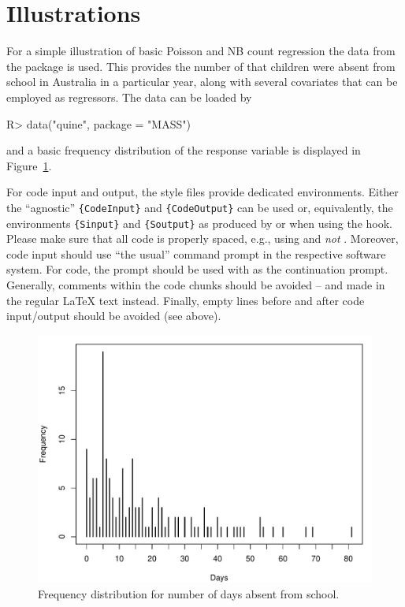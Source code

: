 \documentclass[article]{jss}
\newcommand{\fct}[1]{\code{#1()}}
\begin{document}
\section{Illustrations} \label{sec:illustrations}

For a simple illustration of basic Poisson and NB count regression the
 data from the  package is used. This provides the number
of  that children were absent from school in Australia in a
particular year, along with several covariates that can be employed as regressors.
The data can be loaded by
%
\begin{CodeChunk}
  \begin{CodeInput}
    R> data("quine", package = "MASS")
  \end{CodeInput}
\end{CodeChunk}
%
and a basic frequency distribution of the response variable is displayed in
Figure~\ref{fig:quine}.

\begin{leftbar}
  For code input and output, the style files provide dedicated environments.
  Either the ``agnostic'' \verb|{CodeInput}| and \verb|{CodeOutput}| can be used
  or, equivalently, the environments \verb|{Sinput}| and \verb|{Soutput}| as
  produced by \fct{Sweave} or  when using the 
  hook. Please make sure that all code is properly spaced, e.g., using
   and \emph{not} . Moreover, code input should
  use ``the usual'' command prompt in the respective software system. For
   code, the prompt  should be used with  as
  the continuation prompt. Generally, comments within the code chunks should be
  avoided -- and made in the regular {\LaTeX} text instead. Finally, empty lines
  before and after code input/output should be avoided (see above).
\end{leftbar}

\begin{figure}[t!]
  \centering
  \includegraphics{article-visualization}
  \caption{\label{fig:quine} Frequency distribution for number of days absent
    from school.}
\end{figure}
\end{document}
